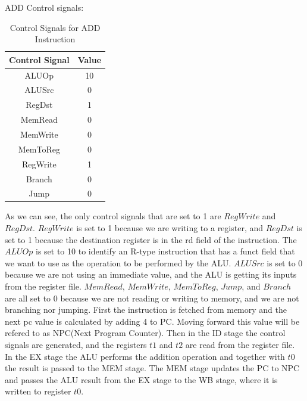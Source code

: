 ADD Control signals:
\begin{table}[H]
    \centering
    \begin{tabular}{|c|c|}
    \hline
    \textbf{Control Signal} & \textbf{Value} \\ \hline
    ALUOp                   & 10             \\ \hline
    ALUSrc                  & 0             \\ \hline
    RegDst                  & 1             \\ \hline
    MemRead                 & 0             \\ \hline
    MemWrite                & 0             \\ \hline
    MemToReg                & 0             \\ \hline
    RegWrite                & 1             \\ \hline
    Branch                  & 0             \\ \hline
    Jump                 & 0             \\ \hline
    \end{tabular}
    \caption{Control Signals for ADD Instruction}
    \label{tab:add_control_signals}
\end{table}

As we can see, the only control signals that are set to 1 are $RegWrite$ and $RegDst$. $RegWrite$ is set to 1 because we are writing to a register, and $RegDst$ is set to 1 because the destination register is in the rd field of the instruction. The $ALUOp$ is set to 10 to identify an R-type instruction that has a funct field that we want to use as the operation to be performed by the ALU. $ALUSrc$ is set to 0 because we are not using an immediate value, and the ALU is getting its inputs from the register file. $MemRead$, $MemWrite$, $MemToReg$, $Jump$, and $Branch$ are all set to 0 because we are not reading or writing to memory, and we are not branching nor jumping.
First the instruction is fetched from memory and the next pc value is calculated by adding 4 to PC. Moving forward this value will be refered to as NPC(Next Program Counter). Then in the ID stage the control signals are generated, and the registers $t1$ and $t2$ are read from the register file. In the EX stage the ALU performs the addition operation and together with $t0$ the result is passed to the MEM stage. The MEM stage updates the PC to NPC and passes the ALU result from the EX stage to the WB stage, where it is written to register $t0$.


